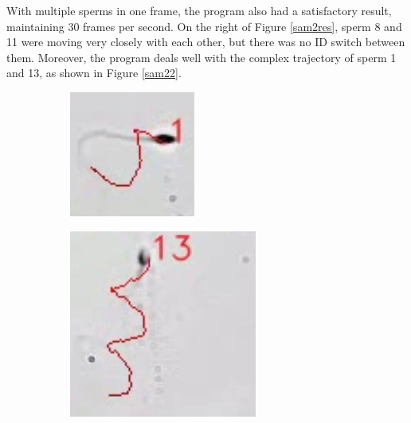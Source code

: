 With multiple sperms in one frame, the program also had a satisfactory result, maintaining 30 frames per second. On the right of Figure \ref{sam2res}, sperm 8 and 11 were moving very closely with each other, but there was no ID switch between them. Moreover, the program deals well with the complex trajectory of sperm 1 and 13, as shown in Figure \ref{sam22}.
\begin{figure}[h]
     \centering
     \begin{subfigure}[b]{0.35\textwidth}
         \centering
         \includegraphics[width=\textwidth]{Images/sam222.png}
     \end{subfigure}
     \hspace{4em}%
     \begin{subfigure}[b]{0.35\textwidth}
         \centering
         \includegraphics[width=\textwidth]{Images/sam22.png}

\end{subfigure}
\end{figure}
